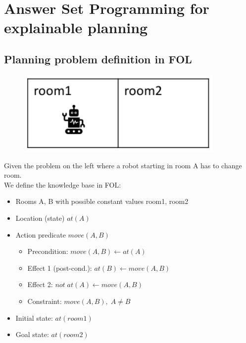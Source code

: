 \section{Answer Set Programming for explainable planning}
\subsection{Planning problem definition in FOL}
\begin{minipage}[t]{0.2\textwidth}
    \begin{figure}[H]
        \includegraphics[width=0.9\textwidth]{img/env.png}
        \centering
    \end{figure}
\end{minipage}
\begin{minipage}[t]{0.8\textwidth}
    Given the problem on the left where a robot starting in room A has to change room.\\
    We define the knowledge base in FOL:
    \begin{itemize}
        \item Rooms A, B with possible constant values room1, room2
        \item Location (state) $at(A)$
        \item Action predicate $move(A, B)$
        \begin{itemize}
            \item Precondition: $move(A, B) \leftarrow at(A)$
            \item Effect 1 (post-cond.): $at(B) \leftarrow move(A, B)$
            \item Effect 2: $not\;at(A) \leftarrow move(A, B)$
            \item Constraint: $move(A, B),\;A \ne B$
        \end{itemize}
        \item Initial state: $at(room1)$
        \item Goal state: $at(room2)$
    \end{itemize}
\end{minipage}
\singlespacing
